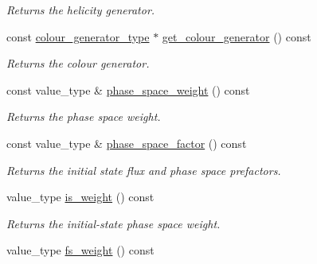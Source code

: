 \begin{DoxyCompactItemize}
\begin{DoxyCompactList}\small\item\em Returns the helicity generator. \end{DoxyCompactList}\item 
\hypertarget{a00436_a864a7a868bda19ea34cb42751fd716ca}{}const \hyperlink{a00077}{colour\+\_\+generator\+\_\+type} $\ast$ \hyperlink{a00436_a864a7a868bda19ea34cb42751fd716ca}{get\+\_\+colour\+\_\+generator} () const \label{a00436_a864a7a868bda19ea34cb42751fd716ca}

\begin{DoxyCompactList}\small\item\em Returns the colour generator. \end{DoxyCompactList}\item 
\hypertarget{a00436_a39fb72cd0e8adca6c6a923a21a64c3c8}{}const value\+\_\+type \& \hyperlink{a00436_a39fb72cd0e8adca6c6a923a21a64c3c8}{phase\+\_\+space\+\_\+weight} () const \label{a00436_a39fb72cd0e8adca6c6a923a21a64c3c8}

\begin{DoxyCompactList}\small\item\em Returns the phase space weight. \end{DoxyCompactList}\item 
\hypertarget{a00436_a855d1f8106314b6956fdbf91e90b7d26}{}const value\+\_\+type \& \hyperlink{a00436_a855d1f8106314b6956fdbf91e90b7d26}{phase\+\_\+space\+\_\+factor} () const \label{a00436_a855d1f8106314b6956fdbf91e90b7d26}

\begin{DoxyCompactList}\small\item\em Returns the initial state flux and phase space prefactors. \end{DoxyCompactList}\item 
\hypertarget{a00436_acb573ed675785481c7aa8561a29f15bf}{}value\+\_\+type \hyperlink{a00436_acb573ed675785481c7aa8561a29f15bf}{is\+\_\+weight} () const \label{a00436_acb573ed675785481c7aa8561a29f15bf}

\begin{DoxyCompactList}\small\item\em Returns the initial-\/state phase space weight. \end{DoxyCompactList}\item 
\hypertarget{a00436_a0d59496a47e5def88b57407636c901b2}{}value\+\_\+type \hyperlink{a00436_a0d59496a47e5def88b57407636c901b2}{fs\+\_\+weight} () const \label{a00436_a0d59496a47e5def88b57407636c901b2}


\end{DoxyCompactItemize}
